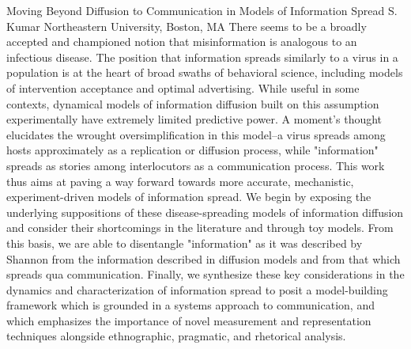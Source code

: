 
    \begin{abstract_online}{Moving Beyond Diffusion to Communication in Models of Information Spread}{%
        S. Kumar}{%
        }{%
        Northeastern University, Boston, MA}
    There seems to be a broadly accepted and championed notion that misinformation is analogous to an infectious disease. The position that information spreads similarly to a virus in a population is at the heart of broad swaths of behavioral science, including models of intervention acceptance and optimal advertising. While useful in some contexts, dynamical models of information diffusion built on this assumption experimentally have extremely limited predictive power. A moment’s thought elucidates the wrought oversimplification in this model–a virus spreads among hosts approximately as a replication or diffusion process, while "information" spreads as stories among interlocutors as a communication process. This work thus aims at paving a way forward towards more accurate, mechanistic, experiment-driven models of information spread. We begin by exposing the underlying suppositions of these disease-spreading models of information diffusion and consider their shortcomings in the literature and through toy models. From this basis, we are able to disentangle "information" as it was described by Shannon from the information described in diffusion models and from that which spreads qua communication. Finally, we synthesize these key considerations in the dynamics and characterization of information spread to posit a model-building framework which is grounded in a systems approach to communication, and which emphasizes the importance of novel measurement and representation techniques alongside ethnographic, pragmatic, and rhetorical analysis. 
    
    \end{abstract_online}
    